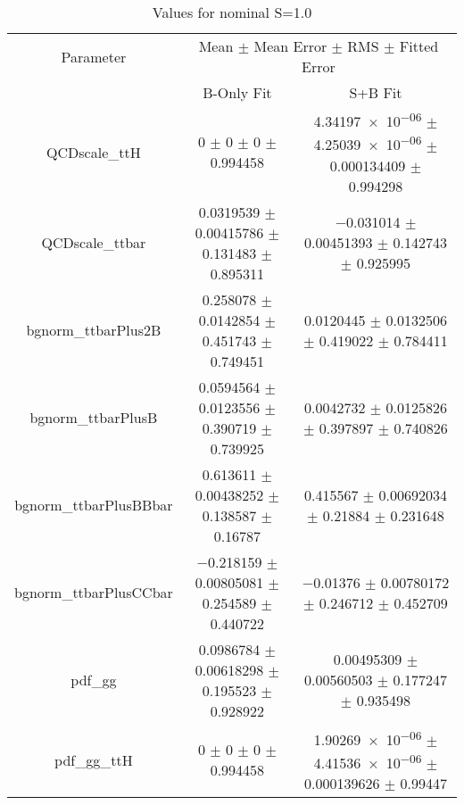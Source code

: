 \begin{table}
\centering
\caption{Values for nominal S=1.0}
\begin{tabular}{ccc}
\toprule
Parameter & \multicolumn{2}{c}{Mean $\pm$ Mean Error $\pm$ RMS $\pm$ Fitted Error}\\
 & B-Only Fit & S+B Fit\\
\midrule
QCDscale\_ttH & \num{0} $\pm$ \num{0} $\pm$ \num{0} $\pm$ \num{0.994458} & \num{4.34197e-06} $\pm$ \num{4.25039e-06} $\pm$ \num{0.000134409} $\pm$ \num{0.994298}\\
QCDscale\_ttbar & \num{0.0319539} $\pm$ \num{0.00415786} $\pm$ \num{0.131483} $\pm$ \num{0.895311} & \num{-0.031014} $\pm$ \num{0.00451393} $\pm$ \num{0.142743} $\pm$ \num{0.925995}\\
bgnorm\_ttbarPlus2B & \num{0.258078} $\pm$ \num{0.0142854} $\pm$ \num{0.451743} $\pm$ \num{0.749451} & \num{0.0120445} $\pm$ \num{0.0132506} $\pm$ \num{0.419022} $\pm$ \num{0.784411}\\
bgnorm\_ttbarPlusB & \num{0.0594564} $\pm$ \num{0.0123556} $\pm$ \num{0.390719} $\pm$ \num{0.739925} & \num{0.0042732} $\pm$ \num{0.0125826} $\pm$ \num{0.397897} $\pm$ \num{0.740826}\\
bgnorm\_ttbarPlusBBbar & \num{0.613611} $\pm$ \num{0.00438252} $\pm$ \num{0.138587} $\pm$ \num{0.16787} & \num{0.415567} $\pm$ \num{0.00692034} $\pm$ \num{0.21884} $\pm$ \num{0.231648}\\
bgnorm\_ttbarPlusCCbar & \num{-0.218159} $\pm$ \num{0.00805081} $\pm$ \num{0.254589} $\pm$ \num{0.440722} & \num{-0.01376} $\pm$ \num{0.00780172} $\pm$ \num{0.246712} $\pm$ \num{0.452709}\\
pdf\_gg & \num{0.0986784} $\pm$ \num{0.00618298} $\pm$ \num{0.195523} $\pm$ \num{0.928922} & \num{0.00495309} $\pm$ \num{0.00560503} $\pm$ \num{0.177247} $\pm$ \num{0.935498}\\
pdf\_gg\_ttH & \num{0} $\pm$ \num{0} $\pm$ \num{0} $\pm$ \num{0.994458} & \num{1.90269e-06} $\pm$ \num{4.41536e-06} $\pm$ \num{0.000139626} $\pm$ \num{0.99447}\\
\bottomrule
\end{tabular}
\end{table}
